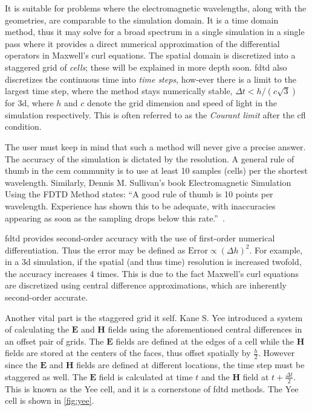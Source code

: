 It is suitable for problems where the electromagnetic wavelengths, along with the geometries, are comparable to the simulation domain. It is a time domain method, thus it may solve for a broad spectrum in a single simulation in a single pass where it provides a direct numerical approximation of the differential operators in Maxwell's curl equations. The spatial domain is discretized into a staggered grid of \emph{cells}; these will be explained in more depth soon. \gls{fdtd} also discretizes the continuous time into \emph{time steps}, how-ever there is a limit to the largest time step, where the method stays numerically stable, $\Delta t < h / \left( c \sqrt{3} \right)$ for \gls{3d}, where $h$ and $c$ denote the grid dimension and speed of light in the simulation respectively. This is often referred to as the \emph{Courant limit} after the \gls{cfl} condition.


The user must keep in mind that such a method will never give a precise answer. The accuracy of the simulation is dictated by the resolution. A general rule of thumb in the \gls{cem} community is to use at least 10 samples (cells) per the shortest wavelength. Similarly, Dennis M. Sullivan's book Electromagnetic Simulation Using the FDTD Method states: “A good rule of thumb is 10 points per wavelength. Experience has shown this to be adequate, with inaccuracies appearing as soon as the sampling drops below this rate.”~\cite[p.10]{sullivan2013fdtd}.


\gls{fdtd} provides second-order accuracy with the use of first-order numerical differentiation. Thus the error may be defined as $\text{Error} \propto (\Delta h)^2$. For example, in a \gls{3d} simulation, if the spatial (and thus time) resolution is increased twofold, the accuracy increases 4 times. This is due to the fact Maxwell's curl equations are discretized using central difference approximations, which are inherently second-order accurate.


Another vital part is the staggered grid it self. Kane S. Yee introduced a system of calculating the $\mathbf{E}$ and $\mathbf{H}$ fields using the aforementioned central differences in an offset pair of grids. The $\mathbf{E}$ fields are defined at the edges of a cell while the $\mathbf{H}$ fields are stored at the centers of the faces, thus offset spatially by $\frac{h}{2}$.  However since the $\mathbf{E}$ and $\mathbf{H}$ fields are defined at different locations, the time step must be staggered as well. The $\mathbf{E}$ field is calculated at time $t$ and the $\mathbf{H}$ field at $t + \frac{\Delta t}{2}$. This is known as the Yee cell, and it is a cornerstone of \gls{fdtd} methods. The Yee cell is shown in \cref{fig:yee}.


